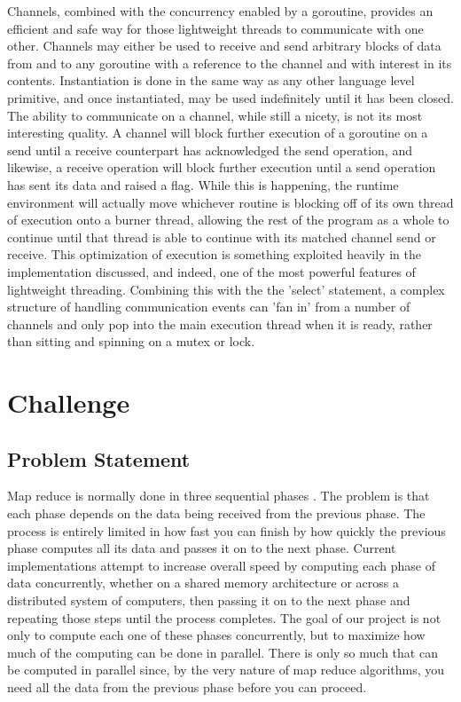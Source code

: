 \documentclass[report]{IEEEtran}
\begin{document}
Channels, combined with the concurrency enabled by a goroutine, provides an efficient and safe way for those lightweight threads to communicate with one other. Channels may either be used to receive and send arbitrary blocks of data from and to any goroutine with a reference to the channel and with interest in its contents. Instantiation is done in the same way as any other language level primitive, and once instantiated, may be used indefinitely until it has been closed. The ability to communicate on a channel, while still a nicety, is not its most interesting quality. A channel will block further execution of a goroutine on a send until a receive counterpart has acknowledged the send operation, and likewise, a receive operation will block further execution until a send operation has sent its data and raised a flag. While this is happening, the runtime environment will actually move whichever routine is blocking off of its own thread of execution onto a burner thread, allowing the rest of the program as a whole to continue until that thread is able to continue with its matched channel send or receive. This optimization of execution is something exploited heavily in the implementation discussed, and indeed, one of the most powerful features of lightweight threading. Combining this with the the 'select' statement, a complex structure of handling communication events can 'fan in' from a number of channels and only pop into the main execution thread when it is ready, rather than sitting and spinning on a mutex or lock.

\section{Challenge}
\subsection{Problem Statement}
Map reduce is normally done in three sequential phases \cite{ORIGIN}. The problem is that each phase depends on the data being received from the previous phase. The process is entirely limited in how fast you can finish by how quickly the previous phase computes all its data and passes it on to the next phase. Current implementations attempt to increase overall speed by computing each phase of data concurrently, whether on a shared memory architecture or across a distributed system of computers, then passing it on to the next phase and repeating those steps until the process completes. The goal of our project is not only to compute each one of these phases concurrently, but to maximize how much of the computing can be done in parallel. There is only so much that can be computed in parallel since, by the very nature of map reduce algorithms, you need all the data from the previous phase before you can proceed. 
\end{document}
